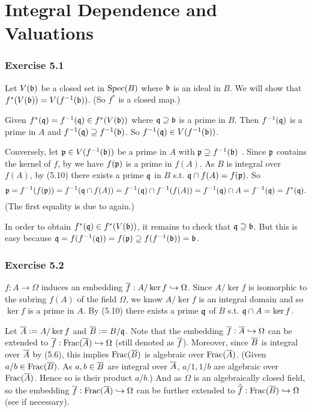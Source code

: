 \documentclass[../A&M.tex]{subfiles}
\begin{document}
\chapter{Integral Dependence and Valuations}

\subsection*{Exercise 5.1}

Let $V(\mathfrak{b})$ be a closed set in $\operatorname{Spec}(B)$ where $\mathfrak{b}$ is an ideal in $B$. We will show that $f^*(V(\mathfrak{b})) = V(f^{-1}(\mathfrak{b}))$. (So $f^*$ is a closed map.)

Given $f^*(\mathfrak{q}) = f^{-1}(\mathfrak{q}) \in f^*(V(\mathfrak{b}))$ where $\mathfrak{q} \supseteq \mathfrak{b}$ is a prime in $B$. Then $f^{-1}(\mathfrak{q})$ is a prime in $A$ and $f^{-1}(\mathfrak{q}) \supseteq f^{-1}(\mathfrak{b})$. So $f^{-1}(\mathfrak{q}) \in V(f^{-1}(\mathfrak{b}))$.

Conversely, let $\mathfrak{p} \in V(f^{-1}(\mathfrak{b}))$ be a prime in $A$ with $\mathfrak{p} \supseteq f^{-1}(\mathfrak{b})$ . Since $\mathfrak{p}$ contains the kernel of $f$, by  we have $f(\mathfrak{p})$ is a prime in $f(A)$. As $B$ is integral over $f(A)$, by (5.10) there exists a prime $\mathfrak{q}$ in $B$ s.t. $\mathfrak{q} \cap f(A) = f(\mathfrak{p})$. So
$$
\mathfrak{p}
= f^{-1}(f(\mathfrak{p}))
= f^{-1}(\mathfrak{q} \cap f(A))
= f^{-1}(\mathfrak{q}) \cap f^{-1}(f(A))
= f^{-1}(\mathfrak{q}) \cap A
= f^{-1}(\mathfrak{q})
= f^*(\mathfrak{q}).
$$
(The first equality is due to  again.)

In order to obtain $f^*(\mathfrak{q}) \in f^*(V(\mathfrak{b}))$, it remains to check that $\mathfrak{q} \supseteq \mathfrak{b}$. But this is easy because $\mathfrak{q} = f(f^{-1}(\mathfrak{q})) = f(\mathfrak{p}) \supseteq f(f^{-1}(\mathfrak{b})) = \mathfrak{b}$.

\subsection*{Exercise 5.2}

$f:A \to \Omega$ induces an embedding $\overline{f}: A/\ker f \hookrightarrow \Omega$. Since $A/\ker f$ is isomorphic to the subring $f(A)$ of the field $\Omega$, we know $A/\ker f$ is an integral domain and so $\ker f$ is a prime in $A$. By (5.10) there exists a prime $\mathfrak{q}$ of $B$ s.t. $\mathfrak{q} \cap A = \ker f$.

Let $\overline{A}:=A/\ker f$ and $\overline{B}:=B/\mathfrak{q}$. Note that the embedding $\overline{f}: \overline{A} \hookrightarrow \Omega$ can be extended to $\overline{f}: \operatorname{Frac}(\overline{A}) \hookrightarrow \Omega$ (still denoted as $\overline{f}$). Moreover, since $\overline{B}$ is integral over $\overline{A}$ by (5.6), this implies $\operatorname{Frac}(\overline{B})$ is algebraic over $\operatorname{Frac}(\overline{A})$. (Given $a/b \in \operatorname{Frac}(\overline{B})$. As $a,b\in\overline{B}$ are integral over $\overline{A}$, $a/1,1/b$ are algebraic over $\operatorname{Frac}(\overline{A})$. Hence so is their product $a/b$.) And as $\Omega$ is an algebraically closed field, so the embedding $\overline{f}: \operatorname{Frac}(\overline{A}) \hookrightarrow \Omega$ can be further extended to $\tilde{\overline{f}}: \operatorname{Frac}(\overline{B}) \hookrightarrow \Omega$ (see  if necessary).
\end{document}
